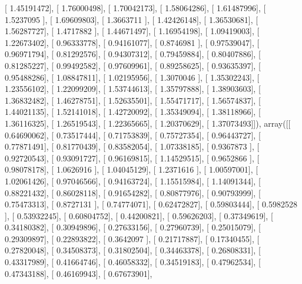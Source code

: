 \documentclass{article}
\begin{document}
       [ 1.45191472],
       [ 1.76000498],
       [ 1.70042173],
       [ 1.58064286],
       [ 1.61487996],
       [ 1.5237095 ],
       [ 1.69609803],
       [ 1.3663711 ],
       [ 1.42426148],
       [ 1.36530681],
       [ 1.56287727],
       [ 1.4717882 ],
       [ 1.44671497],
       [ 1.16954198],
       [ 1.09419003],
       [ 1.22673402],
       [ 0.96333778],
       [ 0.94161077],
       [ 0.8746981 ],
       [ 0.97539047],
       [ 0.96971794],
       [ 0.81292576],
       [ 0.94307312],
       [ 0.79459884],
       [ 0.80407886],
       [ 0.81285227],
       [ 0.99492582],
       [ 0.97609961],
       [ 0.89258625],
       [ 0.93635397],
       [ 0.95488286],
       [ 1.08847811],
       [ 1.02195956],
       [ 1.3070046 ],
       [ 1.35302243],
       [ 1.23556102],
       [ 1.22099209],
       [ 1.53744613],
       [ 1.35797888],
       [ 1.38903603],
       [ 1.36832482],
       [ 1.46278751],
       [ 1.52635501],
       [ 1.55471717],
       [ 1.56574837],
       [ 1.44021135],
       [ 1.52141018],
       [ 1.42720092],
       [ 1.35349094],
       [ 1.38118966],
       [ 1.36116325],
       [ 1.26519543],
       [ 1.22365665],
       [ 1.20370629],
       [ 1.37073493]]), array([[ 0.64690062],
       [ 0.73517444],
       [ 0.71753839],
       [ 0.75727354],
       [ 0.96443727],
       [ 0.77871491],
       [ 0.81770439],
       [ 0.83582054],
       [ 1.07338185],
       [ 0.9367873 ],
       [ 0.92720543],
       [ 0.93091727],
       [ 0.96169815],
       [ 1.14529515],
       [ 0.9652866 ],
       [ 0.98078178],
       [ 1.0626916 ],
       [ 1.04045129],
       [ 1.2371616 ],
       [ 1.00597001],
       [ 1.02061426],
       [ 0.97046566],
       [ 0.94163724],
       [ 1.15515984],
       [ 1.14091344],
       [ 0.88221432],
       [ 0.86028118],
       [ 0.91654282],
       [ 0.80877976],
       [ 0.90793999],
       [ 0.75473313],
       [ 0.8727131 ],
       [ 0.74774071],
       [ 0.62472827],
       [ 0.59803444],
       [ 0.5982528 ],
       [ 0.53932245],
       [ 0.60804752],
       [ 0.44200821],
       [ 0.59626203],
       [ 0.37349619],
       [ 0.34180382],
       [ 0.30949896],
       [ 0.27633156],
       [ 0.27960739],
       [ 0.25015079],
       [ 0.29309897],
       [ 0.22893822],
       [ 0.3642097 ],
       [ 0.21717887],
       [ 0.17340455],
       [ 0.27820048],
       [ 0.34508373],
       [ 0.31802504],
       [ 0.34463378],
       [ 0.26808331],
       [ 0.43317989],
       [ 0.41664746],
       [ 0.46058332],
       [ 0.34519183],
       [ 0.47962534],
       [ 0.47343188],
       [ 0.46169943],
       [ 0.67673901],
\end{document}
